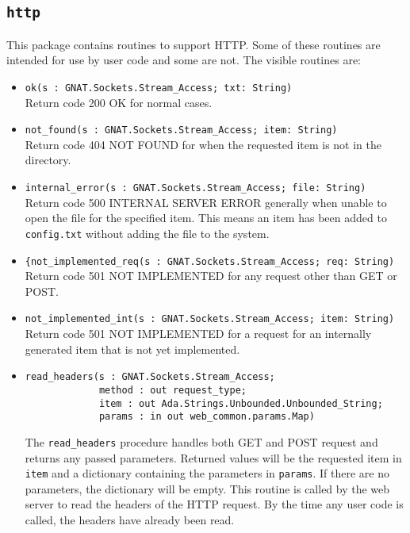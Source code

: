 \documentclass[10pt, openany, draft]{article}
\begin{document}
\subsection{\texttt{http}}
This package contains routines to support HTTP.  Some of these routines are intended for use by user code and some are not.  The visible routines are:
\begin{itemize}
  \item \verb|ok(s : GNAT.Sockets.Stream_Access; txt: String)|\\
  Return code 200 OK for normal cases.
  \item \verb|not_found(s : GNAT.Sockets.Stream_Access; item: String)|\\
  Return code 404 NOT FOUND for when the requested item is not in the directory.
  \item \verb|internal_error(s : GNAT.Sockets.Stream_Access; file: String)|\\
  Return code 500 INTERNAL SERVER ERROR generally when unable to open the file for the specified item.  This means an item has been added to \texttt{config.txt} without adding the file to the system.
  \item \verb|{not_implemented_req(s : GNAT.Sockets.Stream_Access; req: String)|\\
  Return code 501 NOT IMPLEMENTED for any request other than GET or POST.
  \item \verb|not_implemented_int(s : GNAT.Sockets.Stream_Access; item: String)|\\
  Return code 501 NOT IMPLEMENTED for a request for an internally generated item that is not yet implemented.
  \item \begin{verbatim}read_headers(s : GNAT.Sockets.Stream_Access;
             method : out request_type;
             item : out Ada.Strings.Unbounded.Unbounded_String;
             params : in out web_common.params.Map)
            \end{verbatim}
   The \texttt{read\_headers} procedure handles both GET and POST request and returns any passed parameters.  Returned values will be the requested item in \texttt{item} and a dictionary containing the parameters in \texttt{params}.  If there are no parameters, the dictionary will be empty.  This routine is called by the web server to read the headers of the HTTP request.  By the time any user code is called, the headers have already been read.
\end{itemize}
\end{document}
